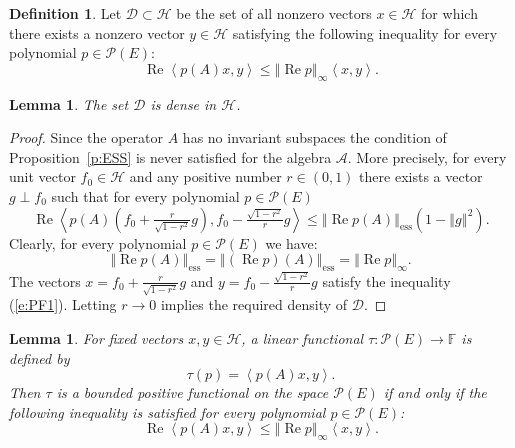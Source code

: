 \documentclass{tran-l}
\newtheorem{lem}[thm]{Lemma}
\theoremstyle{definition}
\newtheorem{defn}[thm]{Definition}
\theoremstyle{remark}
\numberwithin{equation}{subsection}
\DeclareMathOperator{\RE}{Re}
\DeclareMathOperator{\ess}{ess}
\newcommand{\To}{\longrightarrow}
\newcommand{\h}{\mathcal{H}}
\newcommand{\A}{\mathcal{A}}
\newcommand{\Field}{\mathbb{F}}
\newcommand{\Poly}{\mathcal{P}(E)}
\newcommand{\EssD}{\mathcal{D}}
\newcommand{\seq}[1]{\left<#1\right>}
\newcommand{\norm}[1]{\left\Vert#1\right\Vert}
\newcommand{\essnorm}[1]{\norm{#1}_{\ess}}
\begin{document}
\begin{defn}
Let $\EssD\subset\h$ be the set of all nonzero vectors $x\in\h$ for which there exists a nonzero vector $y\in\h$ satisfying the following inequality for every polynomial $p\in\Poly$:
\begin{equation} \label{e:PF1}
  \RE\seq{p(A)x,y} \leq \norm{\RE p}_\infty\seq{x,y}.
\end{equation}
\end{defn}

\begin{lem}\label{l:PF1}
The set $\EssD$ is dense in $\h$.
\end{lem}

\begin{proof}
Since the operator $A$ has no invariant subspaces the condition of Proposition~\ref{p:ESS} is never satisfied for the algebra $\A$. More precisely, for every unit vector $f_0\in\h$ and any positive number $r\in(0,1)$ there exists a vector $g\perp{f_0}$ such that for every polynomial $p\in\Poly$
\[ \RE\seq{p(A)\left(f_0+\tfrac{r}{\sqrt{1-r^2}}g\right),
  f_0-\tfrac{\sqrt{1-r^2}}{r}g} \leq
  \essnorm{\RE{p(A)}}(1 - \norm{g}^2). \]
Clearly, for every polynomial $p\in\Poly$ we have:
\[ \essnorm{\RE p(A)} =
   \essnorm{(\RE p)(A)} =
   \norm{\RE p}_\infty. \]
The vectors $x=f_0+\tfrac{r}{\sqrt{1-r^2}}g$ and $y=f_0-\tfrac{\sqrt{1-r^2}}{r}g$ satisfy the inequality (\ref{e:PF1}). Letting $r\to0$ implies the required density of $\EssD$.
\end{proof}

\begin{lem} \label{l:PF2}
For fixed vectors $x,y\in\h$, a linear functional $\tau\colon\Poly\To\Field$ is defined by
\[ \tau(p) = \seq{p(A)x,y}. \]
Then $\tau$ is a bounded positive functional on the space $\Poly$ if and only if the following inequality is satisfied for every polynomial $p\in\Poly$:
\begin{equation}\label{e:PF1A}
  \RE\seq{p(A)x,y} \leq \norm{\RE p}_\infty\seq{x,y}.
\end{equation}
\end{lem}
\end{document}
